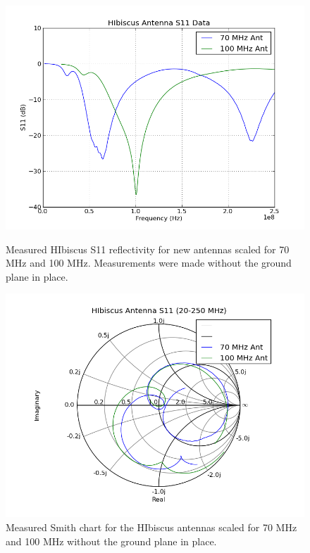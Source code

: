 \begin{figure}[htb]
\centering
\begin{minipage}[b]{0.50\textwidth}
\centering
\includegraphics[width=0.95\linewidth]{SCIHI_system/figures/HIbiscus_S11_dB_both.png}
\caption{Measured HIbiscus S11 reflectivity for new antennas scaled for 70 MHz and 100 MHz. Measurements were made without the ground plane in place. }
\label{Fig:HIS11_dB}
\end{minipage}%
\begin{minipage}[b]{0.02\textwidth}
\hspace{1cm}
\end{minipage}%
\begin{minipage}[b]{0.46\textwidth}
\centering
\includegraphics[width=0.95\linewidth]{SCIHI_system/figures/HIbiscus_S11_Smith_both.png}
\caption{Measured Smith chart for the HIbiscus antennas scaled for 70 MHz and 100 MHz without the ground plane in place.}
\label{Fig:HI_S11_Smith}
\end{minipage}
\end{figure}

